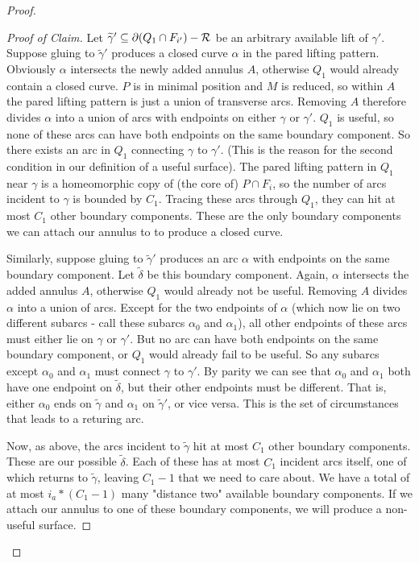 \begin{proof}
\begin{proof}[Proof of Claim]
Let $\widetilde{\gamma}' \subseteq \partial(Q_1 \cap F_{i'}) - \mathcal{R}$ be an arbitrary
available lift of $\gamma'$.  Suppose gluing to $\widetilde{\gamma}'$ produces
a closed curve $\alpha$ in the pared lifting pattern. Obviously $\alpha$
intersects the newly added annulus $A$, otherwise $Q_1$ would already contain
a closed curve. $P$ is in minimal position and $M$ is reduced, so within $A$
the pared lifting pattern is just a union of transverse arcs. Removing $A$
therefore divides $\alpha$ into a union of arcs with endpoints on either
$\gamma$ or $\gamma'$.  $Q_1$ is useful, so none of these arcs can have both
endpoints on the same boundary component. So there exists an arc in $Q_1$
connecting $\gamma$ to $\gamma'$.  (This is the reason for the second condition
in our definition of a useful surface).  The pared lifting pattern in $Q_1$
near $\gamma$ is a homeomorphic copy of (the core of) $P \cap F_i$, so the
number of arcs incident to $\gamma$ is bounded by $C_1$.  Tracing these arcs
through $Q_1$, they can hit at most $C_1$ other boundary components.  These are
the only boundary components we can attach our annulus to to produce a closed
curve.

Similarly, suppose gluing to $\widetilde{\gamma}'$ produces an arc $\alpha$
with endpoints on the same boundary component. Let $\widetilde{\delta}$ be this
boundary component. Again, $\alpha$ intersects the added annulus $A$, otherwise
$Q_1$ would already not be useful. Removing $A$ divides $\alpha$ into a union
of arcs. Except for the two endpoints of $\alpha$ (which now lie on two
different subarcs - call these subarcs $\alpha_0$ and $\alpha_1$), all other
endpoints of these arcs must either lie on $\gamma$ or $\gamma'$.  But no arc
can have both endpoints on the same boundary component, or $Q_1$ would already
fail to be useful.  So any subarcs except $\alpha_0$ and $\alpha_1$ must
connect $\gamma$ to $\gamma'$.  By parity we can see that $\alpha_0$ and
$\alpha_1$ both have one endpoint on $\widetilde{\delta}$, but their other
endpoints must be different.  That is, either $\alpha_0$ ends on
$\widetilde{\gamma}$ and $\alpha_1$ on $\widetilde{\gamma}'$, or vice versa.
This is the set of circumstances that leads to a returing arc.

Now, as above, the arcs incident to $\widetilde{\gamma}$ hit at most $C_1$
other boundary components. These are our possible $\widetilde{\delta}$. Each of
these has at most $C_1$ incident arcs itself, one of which returns to
$\widetilde{\gamma}$, leaving $C_1-1$ that we need to care about. We have
a total of at most $i_a*(C_1-1)$ many "distance two" available boundary
components. If we attach our annulus to one of these boundary components, we
will produce a non-useful surface.


\end{proof}
\end{proof}
